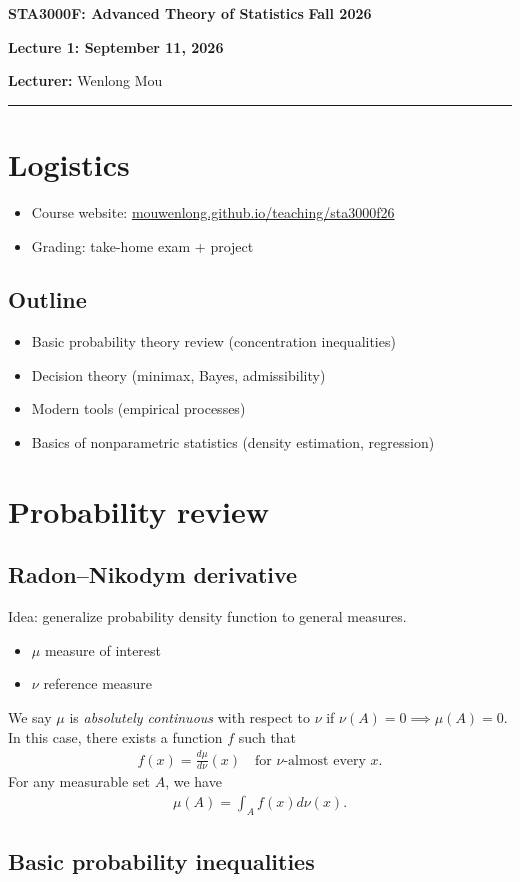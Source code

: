\documentclass[11pt,letterpaper]{article}
\newcommand{\coursenumber}{STA3000F}
\newcommand{\coursetitle}{Advanced Theory of Statistics}
\newcommand{\courseterm}{Fall 2026}
\newcommand{\lecturenumber}{1}
\newcommand{\lecturedate}{September 11, 2026}
\newcommand{\lecturer}{Wenlong Mou}
\newcommand{\makelecturenotesheader}{%
  \noindent
  \textbf{\coursenumber: \coursetitle}%
  \hfill
  \textbf{\courseterm}

  \begin{center}
    {\Large\bfseries Lecture \lecturenumber: \lecturedate}
  \end{center}

  \noindent
  \textbf{Lecturer:} \lecturer
  \par\medskip
  \hrule
  \bigskip
}
\begin{document}
\makelecturenotesheader

\section{Logistics}
\begin{itemize}
  \item Course website: \url{mouwenlong.github.io/teaching/sta3000f26}
  \item Grading: take-home exam + project
\end{itemize}

\subsection{Outline}
\begin{itemize}
\item Basic probability theory review (concentration inequalities)
\item Decision theory (minimax, Bayes, admissibility)
\item Modern tools (empirical processes)
\item Basics of nonparametric statistics (density estimation, regression)
\end{itemize}

\section{Probability review}
\subsection{Radon--Nikodym derivative}
Idea: generalize probability density function to general measures.
\begin{itemize}
  \item $\mu$ measure of interest
  \item $\nu$ reference measure
\end{itemize}
We say $\mu$ is \emph{absolutely continuous} with respect to $\nu$ if $\nu(A) = 0 \implies \mu(A) = 0$. In this case, there exists a function $f$ such that
\begin{align*}
  f (x) = \frac{d\mu}{d\nu}(x) \quad \text{for $\nu$-almost every $x$}.
\end{align*}
For any measurable set $A$, we have
\begin{align*}
  \mu (A) = \int_A f(x) d\nu(x).
\end{align*}
\subsection{Basic probability inequalities}
\end{document}
